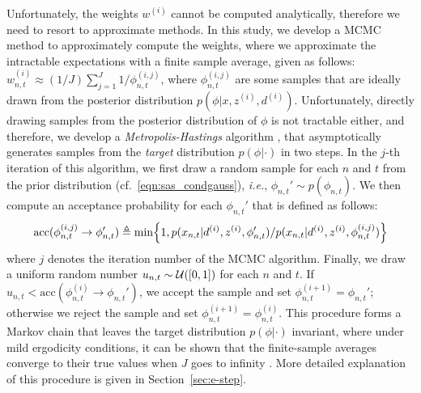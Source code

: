 Unfortunately, the weights $w^{(i)}$ cannot be computed analytically, therefore we need to resort to
approximate methods. In this study, we develop a \ac{MCMC} method to approximately compute the weights, where we approximate the intractable expectations with a finite sample average, given as follows: $w_{n,t}^{(i)} \approx (1/{J}) \sum_{j=1}^{J} 1/{\phi_{n,t}^{(i,j)}}$, where $\phi_{n,t}^{(i,j)}$ are some samples that are ideally drawn from the posterior distribution $p(\phi|x,z^{(i)},d^{(i)})$. Unfortunately, directly drawing samples from the posterior distribution of $\phi$ is not tractable either, and therefore, we develop a \emph{Metropolis-Hastings} algorithm \citep{chib1995understanding}, that asymptotically generates samples from the \emph{target} distribution $p(\phi|\cdot)$ in two steps. In the $j$-th iteration of this algorithm, we first draw a random sample for each $n$ and $t$ from the prior distribution (cf.\ \eqref{eqn:sas_condgauss}), \textit{i.e.}, $\phi_{n,t}'\sim p(\phi_{n,t})$. We then compute an acceptance probability for each $\phi_{n,t}'$ that is defined as follows:
%
\begin{align}
  \text{acc}(\phi_{n,t}^{(i,j)} \rightarrow \phi_{n,t}' ) \triangleq \min \Bigl\{1, {p(x_{n,t}|d^{(i)},z^{(i)},\phi'_{n,t})}/{p(x_{n,t}|d^{(i)},z^{(i)},\phi_{n,t}^{(i,j)})} \Bigr\} \label{eqn:mcmc_acc}
\end{align}
%
where $j$ denotes the iteration number of the \ac{MCMC} algorithm. 
Finally, we draw a uniform random number $u_{n,t} \sim {\cal U}([0, 1])$ for each $n$ and $t$. If $u_{n,t} < \text{acc}(\phi_{n,t}^{(i)} \rightarrow \phi_{n,t}')$, we accept the sample and set $\phi_{n,t}^{(i+1)} = \phi_{n,t}'$; otherwise we reject the sample and set $\phi_{n,t}^{(i+1)} = \phi_{n,t}^{(i)}$. This procedure forms a Markov chain that leaves the target distribution $p(\phi|\cdot)$ invariant, where under mild ergodicity conditions, it can be shown that the finite-sample averages converge to their true values when $J$ goes to infinity \citep{Liu2008}. More detailed explanation of this procedure is given in Section~\ref{sec:e-step}.

%

%
